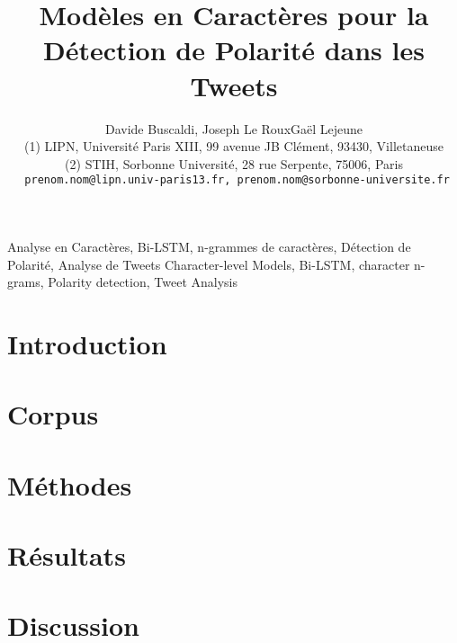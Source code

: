 \documentclass[10pt,twoside]{article}
\title{Modèles en Caractères pour la Détection de Polarité dans les Tweets}
\author{Davide Buscaldi, %
 Joseph Le Roux\up{1}\quad Gaël Lejeune\up{2}\\
  {\small
    (1) LIPN, Université Paris XIII, 99 avenue JB Clément, 93430, Villetaneuse \\ 
    (2) STIH, Sorbonne Université, 28 rue Serpente, 75006, Paris \\ 
    \texttt{
      prenom.nom@lipn.univ-paris13.fr, prenom.nom@sorbonne-universite.fr \\ 
}}}
\begin{document}
\maketitle

\resume{

}


\motsClefs
  {Analyse en Caractères, Bi-LSTM, n-grammes de caractères, Détection de Polarité, Analyse de Tweets}
  {Character-level Models, Bi-LSTM, character n-grams, Polarity detection, Tweet Analysis}


\section{Introduction}


\section{Corpus}


\section{Méthodes}


\section{Résultats}


\section{Discussion}







\end{document}
